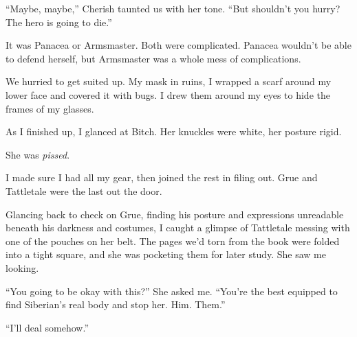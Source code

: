 ``Maybe, maybe,'' Cherish taunted us with her tone.  ``But shouldn't you hurry?  The hero is going to die.''



It was Panacea or Armsmaster.  Both were complicated.  Panacea wouldn't be able to defend herself, but Armsmaster was a whole mess of complications.



We hurried to get suited up.  My mask in ruins, I wrapped a scarf around my lower face and covered it with bugs.  I drew them around my eyes to hide the frames of my glasses.



As I finished up, I glanced at Bitch.  Her knuckles were white, her posture rigid.



She was \emph{pissed}.



I made sure I had all my gear, then joined the rest in filing out.  Grue and Tattletale were the last out the door.



Glancing back to check on Grue, finding his posture and expressions unreadable beneath his darkness and costumes, I caught a glimpse of Tattletale messing with one of the pouches on her belt.  The pages we'd torn from the book were folded into a tight square, and she was pocketing them for later study.  She saw me looking.



``You going to be okay with this?''  She asked me.  ``You're the best equipped to find Siberian's real body and stop her.  Him.  Them.''



``I'll deal somehow.''





